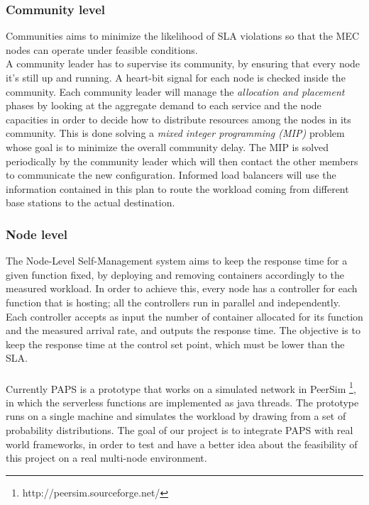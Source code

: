 \begin{figure}[h]
    \centering
    \label{fig:pseudocode}
    \label{fig:communities}
\end{figure}

\subsubsection*{Community level}
Communities aims to minimize the likelihood of SLA violations so that the MEC nodes
can operate under feasible conditions.\\
A community leader has to supervise its community, by ensuring that every node it's still up and running.
A heart-bit signal for each node is checked inside the community.
Each community leader will manage the \textit{allocation and placement} phases by looking at 
the aggregate demand to each service and the node capacities in order to decide how to 
distribute resources among the nodes in its community. This is done solving a \textit{mixed
integer programming (MIP)} problem whose goal is to minimize the overall community delay. 
The MIP is solved periodically by the community leader which will then contact the other members
to communicate the new configuration.
Informed load balancers will use the information contained in this plan to route the workload 
coming from different base stations to the actual destination.

\subsubsection*{Node level}
The Node-Level Self-Management system aims to keep the response time for a given function fixed, 
by deploying and removing containers accordingly to the measured workload.
In order to achieve this, every node has a controller for each function that is hosting; all the controllers
run in parallel and independently.
Each controller accepts as input the number of container allocated for its function and the 
measured arrival rate, and outputs the response time. The objective is to keep the response time
at the control set point, which must be lower than the SLA.
\\
\\
Currently PAPS is a prototype that works on a simulated network in PeerSim \footnote{http://peersim.sourceforge.net/},
in which the serverless functions are implemented as java threads. The prototype runs on a single machine and simulates
the workload by drawing from a set of probability distributions.
The goal of our project is to integrate PAPS with real world frameworks, in order to test and have a better
idea about the feasibility of this project on a real multi-node environment.
